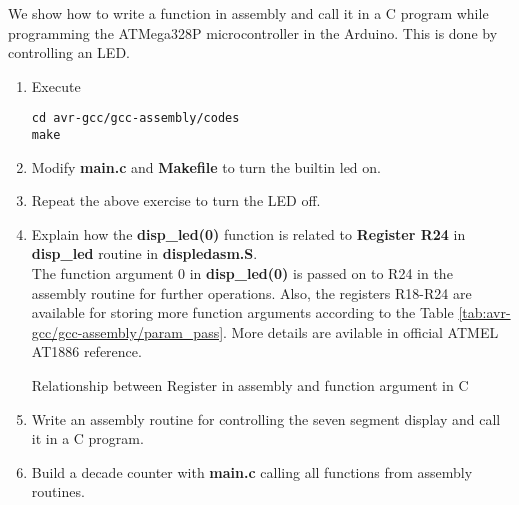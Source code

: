 We show how to write a function in assembly and call it in a C program while programming the ATMega328P microcontroller in the Arduino.  This is done by controlling an LED. 
%
\begin{enumerate}[label=\arabic*.,ref=\theenumi]
\item Execute 
\begin{lstlisting}
cd avr-gcc/gcc-assembly/codes
make
\end{lstlisting}
\item Modify \textbf{main.c} and \textbf{Makefile} to turn the builtin led on.
\item Repeat the above exercise to turn the LED off.
\item Explain how the \textbf{disp\_led(0)} function is related to \textbf{Register R24} in \textbf{disp\_led} routine in \textbf{displedasm.S}.
	\\
\solution The function argument 0 in \textbf{disp\_led(0)} is passed on to R24 in the assembly routine for further operations.  Also, the registers R18-R24 are available for storing more function arguments according to the Table \ref{tab:avr-gcc/gcc-assembly/param_pass}.  More details are avilable in official ATMEL AT1886 reference.

\begin{table}[!ht]
\centering
	
\caption{Relationship between Register in assembly and function argument in C}
\label{tab:avr-gcc/gcc-assembly/param_pass}
\end{table}

\item Write an assembly routine for controlling the seven segment display and call it in a C program.
\item Build a decade counter with \textbf{main.c} calling all functions from assembly routines.
\end{enumerate}



